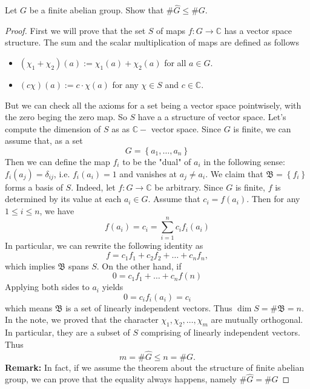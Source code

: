 \documentclass[11pt,letterpaper]{article}
\DeclareMathOperator{\1}{\mathbbm{1}}
\begin{document}
\begin{exercise}\label{ex2}
  Let $G$ be a finite abelian group. Show that $\#\hat{G} \le \#G$.
\end{exercise}
\begin{proof}
  First we will prove that the set $S$ of maps $f\colon G \to \mathbb{C}$ has a vector space structure.
  The sum and the scalar multiplication of maps are defined as follows
  \begin{itemize}
    \item $(\chi_1 + \chi_2)(a) := \chi_1(a)+ \chi_2(a)$ for all $a \in G$.
    \item $(c\chi)(a):= c\cdot\chi(a)$ for any $\chi \in S$ and $c \in \mathbb{C}$.
  \end{itemize}
  But we can check all the axioms for a set being a vector space pointwisely, with the zero
  beging the zero map. So $S$ have a a structure of vector space. Let's compute the dimension of $S$ as
  as $\mathbb{C}-$ vector space. Since $G$ is finite, we can assume that, as a set
  \[G = \left\lbrace a_1,\ldots,a_n \right\rbrace\]
  Then we can define the map $f_i$ to be the "dual" of $a_i$ in the following sense: $f_i(a_j) =\delta_{ij}$, i.e.
  $f_i(a_i)=1$ and vanishes at $a_j \ne a_i$. We claim that $\mathfrak{B}= \left\lbrace f_i \right\rbrace$ forms a basis of $S$.
  Indeed, let $f\colon G \to \mathbb{C}$ be arbitrary. Since $G$ is finite, $f$ is determined by its value at each $a_i \in G$.
  Assume that $c_i = f(a_i)$. Then for any $1 \le i \le n$, we have
  \[f(a_i) = c_i = \sum_{i=1}^n c_i f_i(a_i)\]
  In particular, we can rewrite the following identity as
  \[f = c_1f_1+c_2f_2+\ldots+c_nf_n,\]
  which implies $\mathfrak{B}$ spans $S$. On the other hand, if
  \[ 0 = c_1f_1+\ldots+c_nf(n)\]
  Applying both sides to $a_i$ yields
  \[0 = c_if_i(a_i) = c_i\]
  which means $\mathfrak{B}$ is a set of linearly independent vectors. Thus $\dim S = \#\mathfrak{B} = n$.
  In the note, we proved that the character $\chi_1,\chi_2,\ldots,\chi_m$ are mutually orthogonal. In particular, they are
  a subset of $S$ comprising of linearly independent vectors. Thus
  \[m = \#\hat{G} \le n = \# G. \]
  \textbf{Remark:} In fact, if we assume the theorem about the structure of finite abelian group, we can prove that
  the equality always happens, namely $ \#\hat{G} =\# G$
\end{proof}
\newpage
\end{document}
